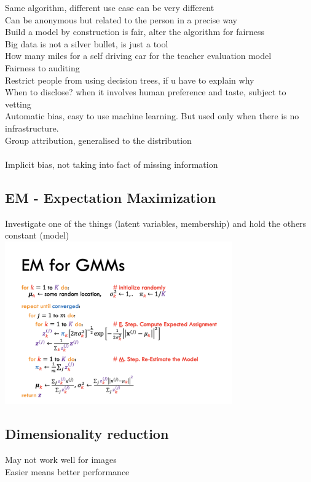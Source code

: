\documentclass[11pt]{article}
\begin{document}
Same algorithm, different use case can be very different\\
Can be anonymous but related to the person in a precise way\\
Build a model by construction is fair, alter the algorithm for fairness\\
Big data is not a silver bullet, is just a tool\\
How many miles for a self driving car for the teacher evaluation model
\\
Fairness to auditing\\
Restrict people from using decision trees, if u have to explain why\\
When to disclose? when it involves human preference and taste, subject to vetting
\\
Automatic bias, easy to use machine learning. But used only when there is no infrastructure.
\\
Group attribution, generalised to the distribution\\
\\
Implicit bias, not taking into fact of missing information
\subsection*{EM - Expectation Maximization}
Investigate one of the things (latent variables, membership) and hold the others constant (model)\\

\includegraphics[height=7cm]{images/s5.png}
\subsection*{Dimensionality reduction}
May not work well for images\\
Easier means better performance
\end{document}
